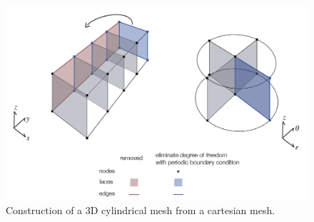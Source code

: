 \begin{figure}
    \begin{center}
    \includegraphics[width=0.9\columnwidth]{figures/cylwrap.png}
    \end{center}
\caption{Construction of a 3D cylindrical mesh from a cartesian mesh.}
\label{fig:cylwrap}
\end{figure}
